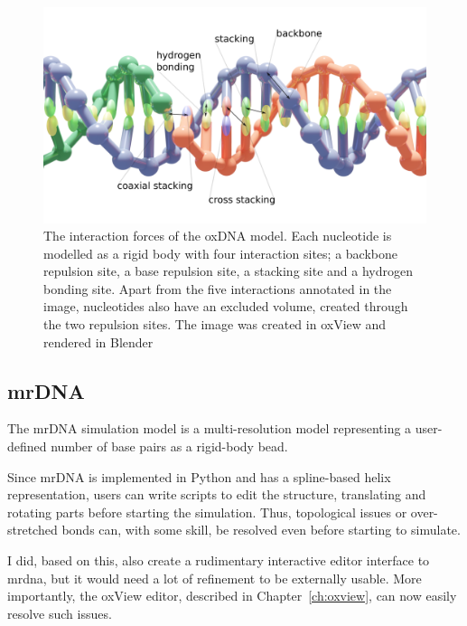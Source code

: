 \begin{figure}[ht]
\begin{center}
    \includegraphics[width=\textwidth]{figures/oxdna_annot.png}
    \caption{The interaction forces of the oxDNA model. Each nucleotide is modelled as a rigid body with four interaction sites; a backbone repulsion site, a base repulsion site, a stacking site and a hydrogen bonding site. Apart from the five interactions annotated in the image, nucleotides also have an excluded volume, created through the two repulsion sites. The image was created in oxView and rendered in Blender}
    \label{fig_oxDNA}
    \end{center}
\end{figure}

\subsection{mrDNA}
\label{sec:mrdna}
The mrDNA simulation model \cite{maffeo2019mrdna} is a multi-resolution model representing a user-defined number of base pairs as a rigid-body bead.

Since mrDNA is implemented in Python and has a spline-based helix representation, users can write scripts to edit the structure, translating and rotating parts before starting the simulation. Thus, topological issues or over-stretched bonds can, with some skill, be resolved even before starting to simulate.

I did, based on this, also create a rudimentary interactive editor interface to mrdna, but it would need a lot of refinement to be externally usable. More importantly, the oxView editor, described in Chapter~\ref{ch:oxview}, can now easily resolve such issues.

